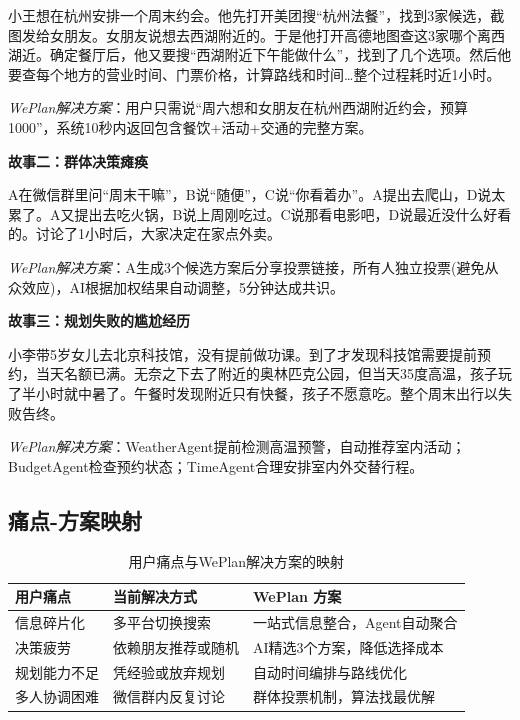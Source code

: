 \documentclass[12pt,a4paper]{ctexart}
\begin{document}
小王想在杭州安排一个周末约会。他先打开美团搜``杭州法餐''，找到3家候选，截图发给女朋友。女朋友说想去西湖附近的。于是他打开高德地图查这3家哪个离西湖近。确定餐厅后，他又要搜``西湖附近下午能做什么''，找到了几个选项。然后他要查每个地方的营业时间、门票价格，计算路线和时间\ldots 整个过程耗时近1小时。

\textit{WePlan解决方案}：用户只需说``周六想和女朋友在杭州西湖附近约会，预算1000''，系统10秒内返回包含餐饮+活动+交通的完整方案。

\textbf{故事二：群体决策瘫痪}

A在微信群里问``周末干嘛''，B说``随便''，C说``你看着办''。A提出去爬山，D说太累了。A又提出去吃火锅，B说上周刚吃过。C说那看电影吧，D说最近没什么好看的。讨论了1小时后，大家决定在家点外卖。

\textit{WePlan解决方案}：A生成3个候选方案后分享投票链接，所有人独立投票(避免从众效应)，AI根据加权结果自动调整，5分钟达成共识。

\textbf{故事三：规划失败的尴尬经历}

小李带5岁女儿去北京科技馆，没有提前做功课。到了才发现科技馆需要提前预约，当天名额已满。无奈之下去了附近的奥林匹克公园，但当天35度高温，孩子玩了半小时就中暑了。午餐时发现附近只有快餐，孩子不愿意吃。整个周末出行以失败告终。

\textit{WePlan解决方案}：WeatherAgent提前检测高温预警，自动推荐室内活动；BudgetAgent检查预约状态；TimeAgent合理安排室内外交替行程。

\subsection{痛点-方案映射}

\begin{table}[H]
\centering
\caption{用户痛点与WePlan解决方案的映射}
\label{tab:pain-solution}
\renewcommand{\arraystretch}{1.4}
{\small
\begin{tabular}{p{3cm} p{4cm} p{5.5cm}}
\toprule
\textbf{用户痛点} & \textbf{当前解决方式} & \textbf{WePlan 方案} \\
\midrule
信息碎片化 & 多平台切换搜索 & 一站式信息整合，Agent自动聚合 \\
决策疲劳 & 依赖朋友推荐或随机 & AI精选3个方案，降低选择成本 \\
规划能力不足 & 凭经验或放弃规划 & 自动时间编排与路线优化 \\
多人协调困难 & 微信群内反复讨论 & 群体投票机制，算法找最优解 \\
\bottomrule
\end{tabular}
}
\end{table}
\end{document}
